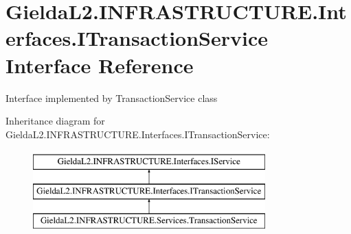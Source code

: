 \hypertarget{interface_gielda_l2_1_1_i_n_f_r_a_s_t_r_u_c_t_u_r_e_1_1_interfaces_1_1_i_transaction_service}{}\section{Gielda\+L2.\+I\+N\+F\+R\+A\+S\+T\+R\+U\+C\+T\+U\+R\+E.\+Interfaces.\+I\+Transaction\+Service Interface Reference}
\label{interface_gielda_l2_1_1_i_n_f_r_a_s_t_r_u_c_t_u_r_e_1_1_interfaces_1_1_i_transaction_service}


Interface implemented by Transaction\+Service class  


Inheritance diagram for Gielda\+L2.\+I\+N\+F\+R\+A\+S\+T\+R\+U\+C\+T\+U\+R\+E.\+Interfaces.\+I\+Transaction\+Service\+:\begin{figure}[H]
\begin{center}
\leavevmode
\includegraphics[height=3.000000cm]{interface_gielda_l2_1_1_i_n_f_r_a_s_t_r_u_c_t_u_r_e_1_1_interfaces_1_1_i_transaction_service}
\end{center}
\end{figure}
